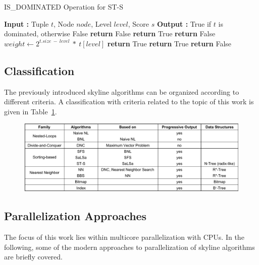 \begin{algorithm}[]
	\caption{IS\_DOMINATED Operation for ST-S} \label{alg:sts-is-dominated}
	\begin{algorithmic}[1]		
		\State \textbf{Input :} Tuple $t$, Node $node$, Level $level$, Score $s$
		\State \textbf{Output :} True if $t$ is dominated, otherwise False
		 \textbf{return} False
		\EndIf
		 \textbf{return} True
		\EndIf
		 \textbf{return} False
		\EndIf
		\State $weight \gets 2^{t.size~-~level}~*~t[level]$
			\State \textbf{return} True
			\EndIf
		\EndFor
		\State \textbf{return} True
		\EndIf
		\State \textbf{return} False
	\end{algorithmic}
\end{algorithm}


\subsection{Classification} \label{classification}
The previously introduced skyline algorithms can be organized according to different criteria. %
A classification with criteria related to the topic of this work is given in Table~\ref{fig:classification}. 

\begin{figure}[h]
	\centering
	\includegraphics[width=1\linewidth]{figures/classification}
	\label{fig:classification}
\end{figure}

\subsection{Parallelization Approaches} \label{subsection:parallelization-approaches}
The focus of this work lies within multicore parallelization with CPUs. In the following, some of the modern approaches to parallelization of skyline algorithms are briefly covered. 

